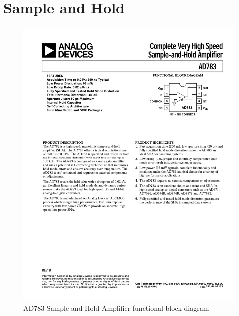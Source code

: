 \section{Sample and Hold}
\begin{figure}[htbp]
	\centering
	\includegraphics[width=.8\textwidth]{Figures/3_sample_hold_ad783.pdf}
	\caption{AD783 Sample and Hold Amplifier functional block diagram \cite{AD783}}
	\label{fig:3_sha_block}
\end{figure}
